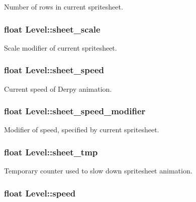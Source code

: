 \-Number of rows in current spritesheet. \hypertarget{structLevel_a267a140bd3de1fc3f23a88623de425ed}{
\subsubsection[{sheet\-\_\-scale}]{\setlength{\rightskip}{0pt plus 5cm}float {\bf \-Level\-::sheet\-\_\-scale}}}\label{structLevel_a267a140bd3de1fc3f23a88623de425ed}
\-Scale modifier of current spritesheet. \hypertarget{structLevel_a41db1345ac158898450907010a49748f}{
\subsubsection[{sheet\-\_\-speed}]{\setlength{\rightskip}{0pt plus 5cm}float {\bf \-Level\-::sheet\-\_\-speed}}}\label{structLevel_a41db1345ac158898450907010a49748f}
\-Current speed of \-Derpy animation. \hypertarget{structLevel_a3cae10fd441bcc14b6a47dd5fedafa59}{
\subsubsection[{sheet\-\_\-speed\-\_\-modifier}]{\setlength{\rightskip}{0pt plus 5cm}float {\bf \-Level\-::sheet\-\_\-speed\-\_\-modifier}}}\label{structLevel_a3cae10fd441bcc14b6a47dd5fedafa59}
\-Modifier of speed, specified by current spritesheet. \hypertarget{structLevel_a22e80ea91fd267dae85c0457e581d072}{
\subsubsection[{sheet\-\_\-tmp}]{\setlength{\rightskip}{0pt plus 5cm}float {\bf \-Level\-::sheet\-\_\-tmp}}}\label{structLevel_a22e80ea91fd267dae85c0457e581d072}
\-Temporary counter used to slow down spritesheet animation. \hypertarget{structLevel_a936a1d131d1e056878474ca831c5e88f}{
\subsubsection[{speed}]{\setlength{\rightskip}{0pt plus 5cm}float {\bf \-Level\-::speed}}}\label{structLevel_a936a1d131d1e056878474ca831c5e88f}
